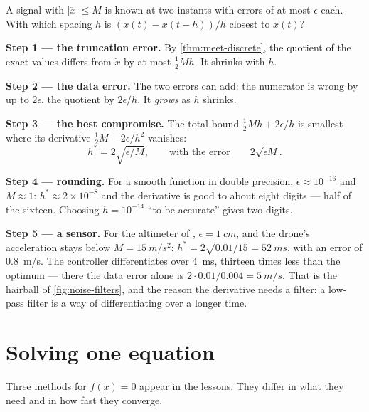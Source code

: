 \begin{example}
\label{ex:F-diff}
A signal with $|\ddot x| \le M$ is known at two instants with errors of at most $\epsilon$ each. With which spacing $h$ is $(x(t) - x(t - h))/h$ closest to $\dot x(t)$?

\textbf{Step 1 — the truncation error.} By \cref{thm:meet-discrete}, the quotient of the exact values differs from $\dot x$ by at most $\tfrac12Mh$. It shrinks with $h$.

\textbf{Step 2 — the data error.} The two errors can add: the numerator is wrong by up to $2\epsilon$, the quotient by $2\epsilon/h$. It \emph{grows} as $h$ shrinks.

\textbf{Step 3 — the best compromise.} The total bound $\tfrac12Mh + 2\epsilon/h$ is smallest where its derivative $\tfrac12M - 2\epsilon/h^2$ vanishes:
\begin{equation}\label{eq:F-hopt}
  h^* = 2\sqrt{\epsilon/M}, \qquad\text{with the error}\qquad 2\sqrt{\epsilon M} .
\end{equation}

\textbf{Step 4 — rounding.} For a smooth function in double precision, $\epsilon \approx 10^{-16}$ and $M \approx 1$: $h^* \approx 2 \times 10^{-8}$ and the derivative is good to about eight digits — half of the sixteen. Choosing $h = 10^{-14}$ \enquote{to be accurate} gives two digits.

\textbf{Step 5 — a sensor.} For the altimeter of , $\epsilon = \SI{1}{cm}$, and the drone's acceleration stays below $M = \SI{15}{m/s^2}$: $h^* = 2\sqrt{0.01/15} = \SI{52}{ms}$, with an error of \SI{0.8}{m/s}. The controller differentiates over \SI{4}{ms}, thirteen times less than the optimum — there the data error alone is $2 \cdot 0.01/0.004 = \SI{5}{m/s}$. That is the hairball of \cref{fig:noise-filters}, and the reason the derivative needs a filter: a low-pass filter is a way of differentiating over a longer time.
\end{example}

\section{Solving one equation}

Three methods for $f(x) = 0$ appear in the lessons. They differ in what they need and in how fast they converge.

